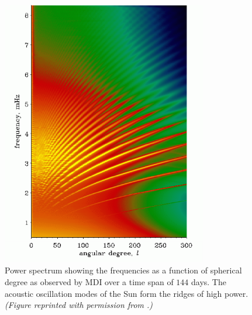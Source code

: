 \begin{figure}
    \centering
    \includegraphics[width=0.8\textwidth]{pics/rhodes.png}
    \caption[Solar power spectrum from MDI]{Power spectrum showing the frequencies as a function of spherical degree as observed by MDI over a time span of $144$ days. 
    The acoustic oscillation modes of the Sun form the ridges of high power. 
        \emph{(Figure reprinted with permission from \citealt{1997SoPh..175..287R}.)}
        \label{fig:rhodes-mdi}}
\end{figure}



